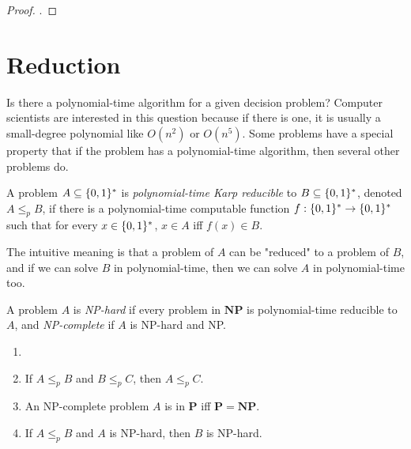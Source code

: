         \begin{proof}
            .
        \end{proof}
    
    \section {Reduction}
        Is there a polynomial-time algorithm for a given decision problem? Computer scientists are interested in this question because if there is one, it is usually a small-degree polynomial like $O(n^2)$ or $O(n^5)$. Some problems have a special property that if the problem has a polynomial-time algorithm, then several other problems do.
        
        \begin{defn} \label{def_poly_karp}
            A problem $A \subseteq \{0,1\}^\ast$ is \emph{polynomial-time Karp reducible} to $B \subseteq \{0,1\}^\ast$, denoted $A \leq_p B$, if there is a polynomial-time computable function $f: \{0,1\}^\ast \rightarrow \{0,1\}^\ast$ such that for every $x \in \{0,1\}^\ast$, $x \in A$ iff $f(x) \in B$.
        \end{defn}
        
        The intuitive meaning is that a problem of $A$ can be "reduced" to a problem of $B$, and if we can solve $B$ in polynomial-time, then we can solve $A$ in polynomial-time too.
        
        \begin{defn}[NP-complete] \label{def_npc}
            A problem $A$ is \emph{NP-hard} if every problem in $\mathbf{NP}$ is polynomial-time reducible to $A$, and \emph{NP-complete} if $A$ is NP-hard and NP.
        \end{defn}
        
        \begin{thm} \label{thm_leqp_transitive}
            \begin{enumerate}
                \item[]
                \item If $A \leq_p B$ and $B \leq_p C$, then $A \leq_p C$.
                \item An NP-complete problem $A$ is in $\mathbf{P}$ iff $\mathbf{P}=\mathbf{NP}$.
                \item If $A \leq_p B$ and $A$ is NP-hard, then $B$ is NP-hard.
            \end{enumerate}
        \end{thm}
        
